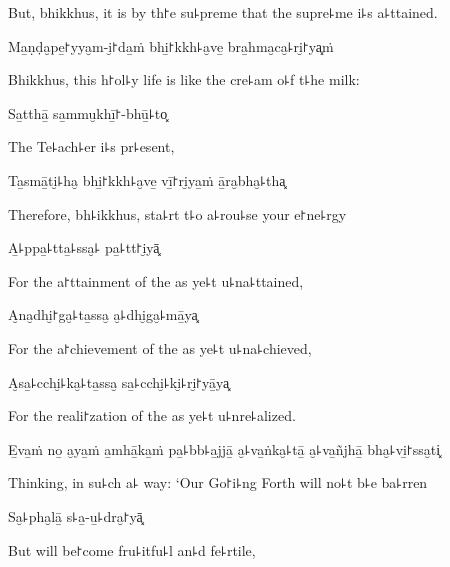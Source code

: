 \begin{english}
  But, bhikkhus, it is by th꜓e su꜕preme that the supre꜕me i꜕s a꜕ttained.
\end{english}

Ma̱ṇḍa̮pe̱꜓yya̮m-i̮꜓da̱ṁ bhi̱꜓kkh꜕a̮ve̱ bra̱hma̮ca̮꜕ri̮꜓ya͓ṁ

\begin{english}
  Bhikkhus, this h꜓ol꜕y life is like the cre꜕am o꜕f t꜕he milk:
\end{english}

Sa̱tthā̱ sa̱mmu̮khī̱꜓-bhū̱꜕to͓

\begin{english}
  The Te꜕ach꜕er i꜕s pr꜕esent,
\end{english}

Ta̱smā̱ti̮꜕ha̮ bhi̱꜓kkh꜕a̮ve̱ vī̱꜓ri̮ya̱ṁ ā̱ra̮bha̮꜕tha͓

\begin{english}
  Therefore, bh꜕ikkhus, sta꜕rt t꜕o a꜕rou꜕se your e꜓ne꜕rgy
\end{english}

A̱꜕ppa̱꜕tta̱꜕ssa̮꜕ pa̱꜕tt꜓i̮yā͓

\begin{english}
  For the a꜓ttainment of the as ye꜕t u꜕na꜕ttained,
\end{english}

\ifaivedition
\clearpage
\fi

A̮na̮dhi̮꜓ga̮꜕ta̱ssa̮ a̮꜕dhi̮ga̮꜕mā̱ya͓

\begin{english}
  For the a꜓chievement of the as ye꜕t u꜕na꜕chieved,
\end{english}

A̮sa̱꜕cchi̮꜕ka̮꜕ta̱ssa̮ sa̱꜕cchi̮꜕ki̮꜕ri̮꜓yā̱ya͓

\begin{english}
  For the reali꜓zation of the as ye꜕t u꜕nre꜕alized.
\end{english}

E̱va̱ṁ no̱ a̮ya̱ṁ a̱mhā̱ka̱ṁ pa̱꜕bb꜕a̱jjā̱ a̮꜕va̱ṅka̮꜕tā̱ a̮꜕va̱ñjhā̱ bha̮꜕vi̱꜓ssa̮ti͓

\begin{english}
  Thinking, in su꜕ch a꜕ way: `Our Go꜓i꜕ng Forth will no꜕t b꜕e ba꜕rren
\end{english}

Sa̮꜕pha̮lā̱ s꜕a̱-u̱꜕dra̮꜓yā͓

\begin{english}
  But will be꜓come fru꜕itfu꜕l an꜕d fe꜕rtile,
\end{english}

